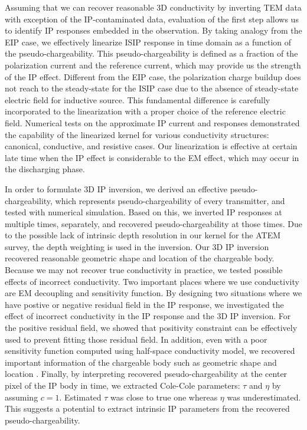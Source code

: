 \documentclass[a4paper, 11pt]{article}
\begin{document}
Assuming that we can recover reasonable 3D conductivity by inverting TEM data with exception of the IP-contaminated data, evaluation of the first step allows us to identify IP responses embedded in the observation. 
By taking analogy from the EIP case, we effectively linearize ISIP response in time domain as a function of the pseudo-chargeability. 
This pseudo-chargeability is defined as a fraction of the polarization current and the reference current, which may provide us the strength of the IP effect. 
Different from the EIP case, the polarization charge buildup does not reach to the steady-state for the ISIP case due to the absence of steady-state electric field for inductive source. 
This fundamental difference is carefully incorporated to the linearization with a proper choice of the reference electric field. 
Numerical tests on the approximate IP current and responses demonstrated the capability of the linearized kernel for various conductivity structures: canonical, conductive, and resistive cases. 
Our linearization is effective at certain late time when the IP effect is considerable to the EM effect, which may occur in the discharging phase. 

In order to formulate 3D IP inversion, we derived an effective pseudo-chargeability, which represents pseudo-chargeability of every transmitter, and tested with numerical simulation. 
Based on this, we inverted IP responses at multiple times, separately, and recovered pseudo-chargeability at those times.
Due to the possible lack of intrinsic depth resolution in our kernel for the ATEM survey, the depth weighting is used in the inversion.  
Our 3D IP inversion recovered reasonable geometric shape and location of the chargeable body. 
Because we may not recover true conductivity in practice, we tested possible effects of incorrect conductivity. 
Two important places where we use conductivity are EM decoupling and sensitivity function. 
By designing two situations where we have postive or negative residual field in the IP response, we investigated the effect of incorrect conductivity in the IP response and the 3D IP inversion. 
For the positive residual field, we showed that positivity constraint can be effectively used to prevent fitting those residual field. 
In addition, even with a poor sensitivity function computed using half-space conductivity model, we recovered important information of the chargeable body such as geometric shape and location . 
Finally, by interpreting recovered pseudo-chargeability at the center pixel of the IP body in time, we extracted Cole-Cole parameters: $\tau$ and $\eta$ by assuming $c=1$. 
Estimated $\tau$ was close to true one whereas $\eta$ was underestimated.
This suggests a potential to extract intrinsic IP parameters from the recovered pseudo-chargeability. 
\end{document}
